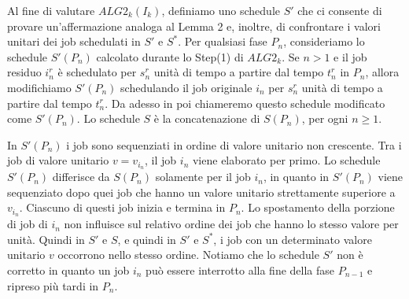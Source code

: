 \documentclass[12pt]{article}
\begin{document}
Al fine di valutare $ALG2_{k}(I_{k})$, definiamo uno schedule $S'$ che ci consente di provare un'affermazione analoga al Lemma 2 e, inoltre, di confrontare i valori unitari dei job schedulati in $S'$ e $S^{*}$. Per qualsiasi fase $P_{n}$, consideriamo lo schedule $S'(P_{n})$ calcolato durante lo Step(1) di $ALG2_{k}$. Se $n > 1$ e il job residuo $i^{r}_{n}$ è schedulato per $s^{r}_{n}$ unità di tempo a partire dal tempo $t^{r}_{n}$ in $P_{n}$, allora modifichiamo $S'(P_{n})$ schedulando il job originale $i_{n}$ per $s^{r}_{n}$ unità di tempo a partire dal tempo $t^{r}_{n}$. Da adesso in poi chiameremo questo schedule modificato come $S'(P_{n})$. Lo schedule $S$ è la concatenazione di $S(P_{n})$, per ogni $n \geq 1$.

In $S'(P_{n})$ i job sono sequenziati in ordine di valore unitario non crescente. Tra i job di valore unitario $v = v_{i_{n}}$, il job $i_{n}$ viene elaborato per primo. Lo schedule $S'(P_{n})$ differisce da $S(P_{n})$ solamente per il job $i_{n}$, in quanto in $S'(P_{n})$ viene sequenziato dopo quei job che hanno un valore unitario strettamente superiore a $v_{i_{n}}$. Ciascuno di questi job inizia e termina in $P_{n}$. Lo spostamento della porzione di job di $i_{n}$ non influisce sul relativo ordine dei job che hanno lo stesso valore per unità. Quindi in $S'$ e $S$, e quindi in $S'$ e $S^{*}$, i job con un determinato valore unitario $v$ occorrono nello stesso ordine. Notiamo che lo schedule $S'$ non è corretto in quanto un job $i_{n}$ può essere interrotto alla fine della fase $P_{n-1}$ e ripreso più tardi in $P_{n}$.
\end{document}
